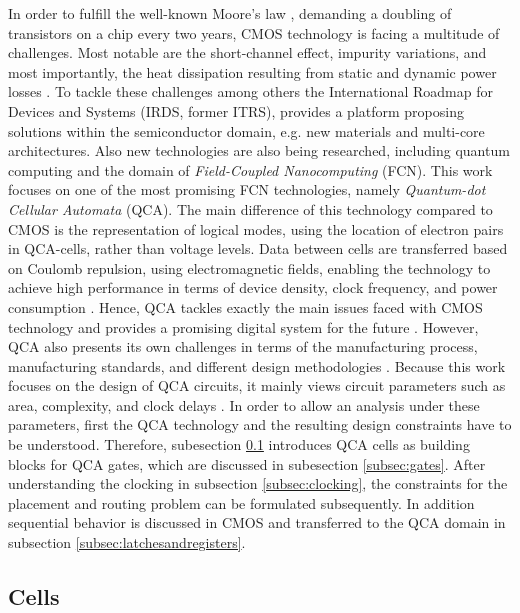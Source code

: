 In order to fulfill the well-known Moore's law \cite{Moores_Law}, demanding a doubling of transistors on a chip every two years, CMOS technology is facing a multitude of challenges. Most notable are the short-channel effect, impurity variations, and most importantly, the heat dissipation resulting from static and dynamic power losses \cite{challenges_1, challenges_2, challenges_3}. To tackle these challenges among others the International Roadmap for Devices and Systems (IRDS, former ITRS), provides a platform proposing solutions within the semiconductor domain, e.g. new materials and multi-core architectures. Also new technologies are also being researched, including quantum computing and the domain of \textit{Field-Coupled Nanocomputing} (FCN). This work focuses on one of the most promising FCN technologies, namely \textit{Quantum-dot Cellular Automata} (QCA). The main difference of this technology compared to CMOS is the representation of logical modes, using the location of electron pairs in QCA-cells, rather than voltage levels. Data between cells are transferred based on Coulomb repulsion, using electromagnetic fields, enabling the technology to achieve high performance in terms of device density, clock frequency, and power consumption \cite{mohammadi2016efficient}. Hence, QCA tackles exactly the main issues faced with CMOS technology and provides a promising digital system for the future \cite{ahmad2018optimal}. However, QCA also presents its own challenges in terms of the manufacturing process, manufacturing standards, and different design
methodologies \cite{Bennet_waveform}. Because this work focuses on the design of QCA circuits, it mainly views circuit parameters such as area, complexity, and clock delays \cite{ahmad2018optimal}. In order to allow an analysis under these parameters, first the QCA technology and the resulting design constraints have to be understood. Therefore, subesection \ref{subsec:cells} introduces QCA cells as building blocks for QCA gates, which are discussed in subesection \ref{subsec:gates}. After understanding the clocking in subsection \ref{subsec:clocking}, the constraints for the placement and routing problem can be formulated subsequently. In addition sequential behavior is discussed in CMOS and transferred to the QCA domain in subsection \ref{subsec:latchesandregisters}.

\subsection{Cells}\label{subsec:cells}


